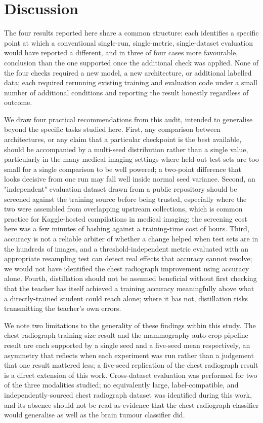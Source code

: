 \documentclass[conference]{IEEEtran}
\begin{document}
\section{Discussion}

The four results reported here share a common structure: each identifies a specific point at which a conventional single-run, single-metric, single-dataset evaluation would have reported a different, and in three of four cases more favourable, conclusion than the one supported once the additional check was applied. None of the four checks required a new model, a new architecture, or additional labelled data; each required rerunning existing training and evaluation code under a small number of additional conditions and reporting the result honestly regardless of outcome.

We draw four practical recommendations from this audit, intended to generalise beyond the specific tasks studied here. First, any comparison between architectures, or any claim that a particular checkpoint is the best available, should be accompanied by a multi-seed distribution rather than a single value, particularly in the many medical imaging settings where held-out test sets are too small for a single comparison to be well powered; a two-point difference that looks decisive from one run may fall well inside normal seed variance. Second, an "independent" evaluation dataset drawn from a public repository should be screened against the training source before being trusted, especially where the two were assembled from overlapping upstream collections, which is common practice for Kaggle-hosted compilations in medical imaging; the screening cost here was a few minutes of hashing against a training-time cost of hours. Third, accuracy is not a reliable arbiter of whether a change helped when test sets are in the hundreds of images, and a threshold-independent metric evaluated with an appropriate resampling test can detect real effects that accuracy cannot resolve; we would not have identified the chest radiograph improvement using accuracy alone. Fourth, distillation should not be assumed beneficial without first checking that the teacher has itself achieved a training accuracy meaningfully above what a directly-trained student could reach alone; where it has not, distillation risks transmitting the teacher's own errors.

We note two limitations to the generality of these findings within this study. The chest radiograph training-size result and the mammography auto-crop pipeline result are each supported by a single seed and a five-seed mean respectively, an asymmetry that reflects when each experiment was run rather than a judgement that one result mattered less; a five-seed replication of the chest radiograph result is a direct extension of this work. Cross-dataset evaluation was performed for two of the three modalities studied; no equivalently large, label-compatible, and independently-sourced chest radiograph dataset was identified during this work, and its absence should not be read as evidence that the chest radiograph classifier would generalise as well as the brain tumour classifier did.
\end{document}
